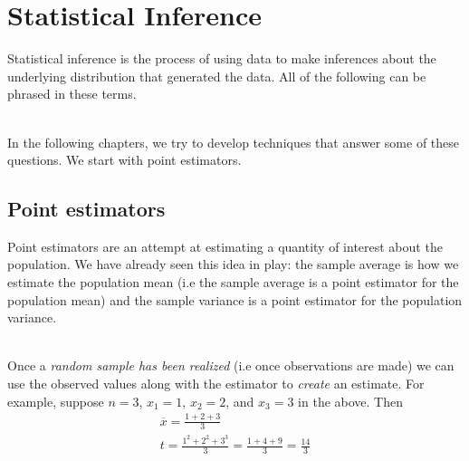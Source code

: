 \chapter[Statistical Inference]{Statistical Inference}

Statistical inference is the process of using data to make inferences about the underlying distribution that generated the data. All of the following can be phrased in these terms.




\hfill\\

In the following chapters, we try to develop techniques that answer some of these questions. We start with point estimators.

\section{Point estimators}

Point estimators are an attempt at estimating a quantity of interest about the population. We have already seen this idea in play: the sample average is how we estimate the population mean (i.e the sample average is a point estimator for the population mean) and the sample variance is a point estimator for the population variance.


\\

Once a \textit{random sample has been realized} (i.e once observations are made) we can use the observed values along with the estimator to \textit{create} an estimate. For example, suppose $n=3$, $x_1 = 1$, $x_2 = 2$, and $x_3 =3$ in the above. Then
\begin{gather*}
    \overline{x} = \frac{1 + 2 + 3}{3} \\
    t = \frac{1^2 + 2^2 + 3^3}{3} = \frac{1+4+9}{3} = \frac{14}{3}
\end{gather*}

